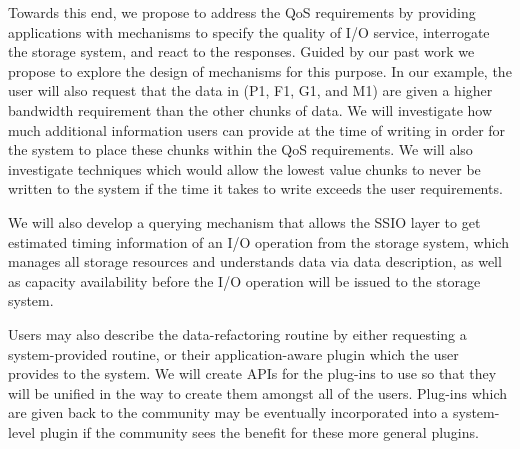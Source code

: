 %

Towards this end, we propose to
address the QoS requirements by providing applications with mechanisms to
specify the quality of I/O service, interrogate the storage system, and react
to the responses. Guided by our past work we propose to explore the design of
mechanisms for this purpose.  In our example, the user will also request that
the data in (P1, F1, G1, and M1) are given a higher bandwidth requirement than
the other chunks of data. We will investigate how much additional information users
can provide at the time of writing in order for the system to place these chunks within
the QoS requirements. We will also investigate techniques which would allow the lowest
value chunks to never be written to the system if the time it takes to write exceeds the user
requirements.



We will also develop a querying mechanism that allows the SSIO layer
to get estimated timing information of an I/O operation from the storage system, which
manages all storage resources and understands data via data description, as well
as capacity availability before the I/O operation will
be issued to the storage system. 


Users may also describe the data-refactoring routine by either requesting a system-provided
routine, or their application-aware plugin which the user provides to the system. We will
create APIs for the plug-ins to use so that they will be unified in the way to create them
amongst all of the users. Plug-ins which are given back to the community may be 
eventually incorporated into a system-level plugin if the community sees the benefit for
these more general plugins.

